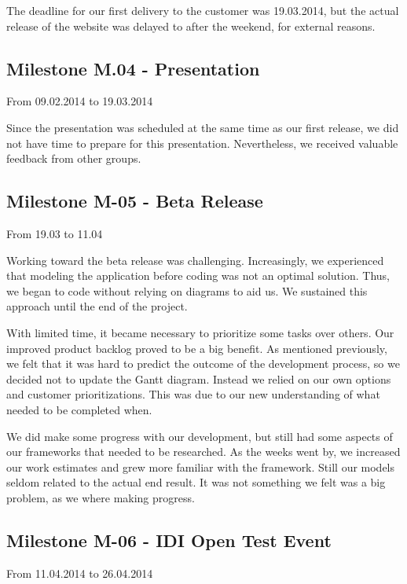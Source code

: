 The deadline for our first delivery to the customer was 19.03.2014, but the actual release of
the website was delayed to after the weekend, for external reasons. 




\subsection{Milestone M.04 - Presentation}
\label{sec:M04}
From 09.02.2014 to 19.03.2014

Since the presentation was scheduled at the same time as our first
release, we did not have time to prepare for this presentation.
Nevertheless, we received valuable feedback from other groups.




\subsection{Milestone M-05 - Beta Release}
\label{sec:M05}
From 19.03 to 11.04

Working toward the beta release was challenging. Increasingly, we
experienced that modeling the application before coding was not an
optimal solution. Thus, we began to code without relying on diagrams to
aid us. We sustained this approach until the end of the project.




With limited time, it became necessary to prioritize some tasks over
others. Our improved product backlog proved to be a
big benefit. As mentioned previously, we felt that it was hard to
predict the outcome of the development process, so we decided not to
update the Gantt diagram. Instead we relied on our own options and
customer prioritizations. This was due to our new understanding of what
needed to be completed when.




We did make some progress with our development, but still had some
aspects of our frameworks that needed to be researched. As the weeks went
by, we increased our work estimates and grew more familiar with the
framework. Still our models seldom related to the actual end result. It
was not something we felt was a big problem, as we where making progress. \ 







\subsection{Milestone M-06 - IDI Open Test Event}
\label{sec:M06}
From 11.04.2014 to 26.04.2014

